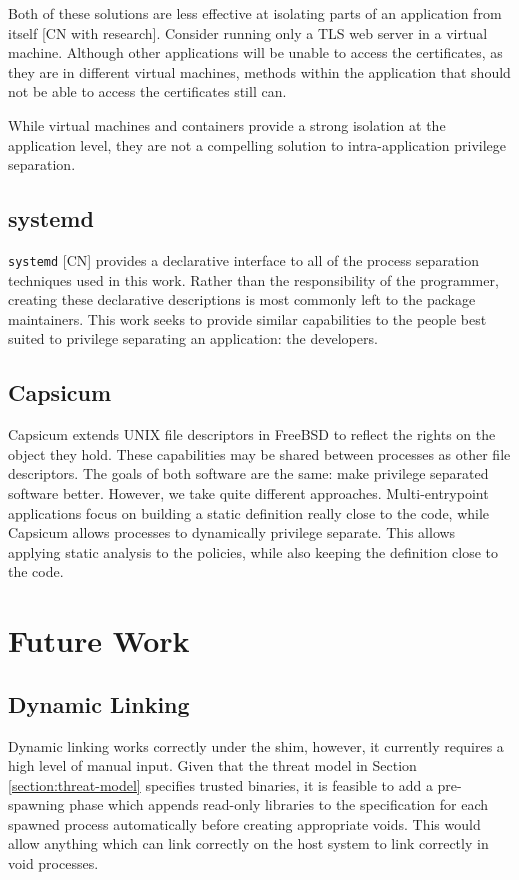\documentclass[sigplan]{acmart}
\begin{document}
Both of these solutions are less effective at isolating parts of an application from itself [CN with research]. Consider running only a TLS web server in a virtual machine. Although other applications will be unable to access the certificates, as they are in different virtual machines, methods within the application that should not be able to access the certificates still can.

While virtual machines and containers provide a strong isolation at the application level, they are not a compelling solution to intra-application privilege separation.

\subsection{systemd}

\texttt{systemd} [CN] provides a declarative interface to all of the process separation techniques used in this work. Rather than the responsibility of the programmer, creating these declarative descriptions is most commonly left to the package maintainers. This work seeks to provide similar capabilities to the people best suited to privilege separating an application: the developers.

\subsection{Capsicum}

Capsicum \citep{watson_capsicum_2010} extends UNIX file descriptors in FreeBSD to reflect the rights on the object they hold. These capabilities may be shared between processes as other file descriptors. The goals of both software are the same: make privilege separated software better. However, we take quite different approaches. Multi-entrypoint applications focus on building a static definition really close to the code, while Capsicum allows processes to dynamically privilege separate. This allows applying static analysis to the policies, while also keeping the definition close to the code.

\section{Future Work}

\subsection{Dynamic Linking}

Dynamic linking works correctly under the shim, however, it currently requires a high level of manual input. Given that the threat model in Section \ref{section:threat-model} specifies trusted binaries, it is feasible to add a pre-spawning phase which appends read-only libraries to the specification for each spawned process automatically before creating appropriate voids. This would allow anything which can link correctly on the host system to link correctly in void processes.
\end{document}
